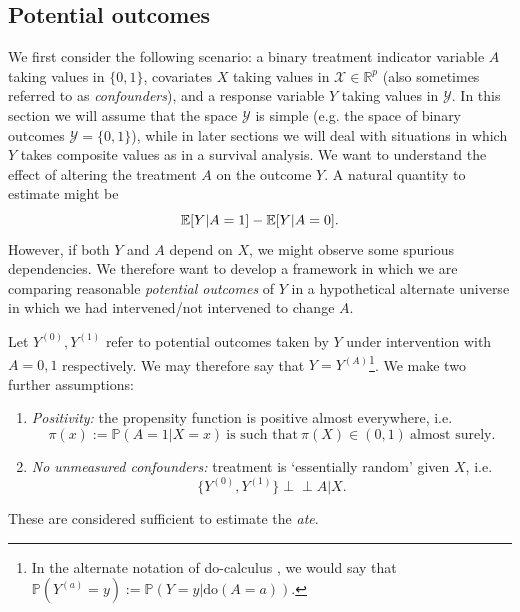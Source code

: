 \documentclass[../thesis.tex]{subfiles}
\begin{document}
\subsection{Potential outcomes}
We first consider the following scenario:  a binary treatment indicator variable $A$ taking values in $\{0,1\}$,  covariates $X$ taking values in $\mathcal{X} \in \mathbb{R}^p$ (also sometimes referred to as \emph{confounders}), and a response variable $Y$ taking values in $\mathcal{Y}$. In this section we will assume that the space $\mathcal{Y}$ is simple (e.g. the space of binary outcomes $\mathcal{Y} = \{0,1\}$), while in later sections we will deal with situations in which $Y$ takes composite values as in a survival analysis. We want to understand the effect of altering the treatment $A$ on the outcome $Y$. A natural quantity to estimate might be
\[\mathbb{E}[Y | A = 1] - \mathbb{E}[Y | A = 0].\]
However, if both $Y$ and $A$ depend on $X$, we might observe some spurious dependencies. We therefore want to develop a framework in which we are comparing reasonable \emph{potential outcomes} of $Y$ in a hypothetical alternate universe in which we had intervened/not intervened to change $A$.

Let $Y^{(0)}, Y^{(1)}$ refer to potential outcomes taken by $Y$ under intervention with $A=0,1$
respectively. We may therefore say that $Y=Y^{(A)}$\footnote{In the alternate notation of do-calculus \citep{pearl_causal_1995, pearl_-calculus_2012}, we would say that $\mathbb{P}(Y^{(a)} = y) := \mathbb{P}(Y = y |  \text{do}(A=a))$.}. We make two further assumptions: 
\begin{enumerate}
    \item \emph{Positivity:} the propensity function is positive almost everywhere, i.e. 
    \[\pi(x) := \mathbb{P}(A=1 | X = x) \  \text{is such that} \ \pi(X) \in (0,1) \ \text{almost surely.}\]
    \item \emph{No unmeasured confounders:} treatment is `essentially random' given $X$, i.e.
    \[\{Y^{(0)}, Y^{(1)}\} \perp\!\!\!\perp A | X. \]
\end{enumerate}
These are considered sufficient to estimate the \emph{\gls{ate}}.
\end{document}
